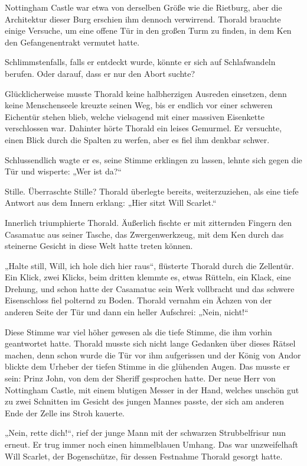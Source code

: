 Nottingham Castle war etwa von derselben Größe wie die Rietburg, aber die Architektur dieser Burg erschien ihm dennoch verwirrend. Thorald brauchte einige Versuche, um eine offene Tür in den großen Turm zu finden, in dem Ken den Gefangenentrakt vermutet hatte.

Schlimmstenfalls, falls er entdeckt wurde, könnte er sich auf Schlafwandeln berufen. Oder darauf, dass er nur den Abort suchte?

Glücklicherweise musste Thorald keine halbherzigen Ausreden einsetzen, denn keine Menschenseele kreuzte seinen Weg, bis er endlich vor einer schweren Eichentür stehen blieb, welche vielsagend mit einer massiven Eisenkette verschlossen war. Dahinter hörte Thorald ein leises Gemurmel. Er versuchte, einen Blick durch die Spalten zu werfen, aber es fiel ihm denkbar schwer.

Schlussendlich wagte er es, seine Stimme erklingen zu lassen, lehnte sich gegen die Tür und wisperte: „Wer ist da?“

Stille. Überraschte Stille? Thorald überlegte bereits, weiterzuziehen, als eine tiefe Antwort aus dem Innern erklang: „Hier sitzt Will Scarlet.“

Innerlich triumphierte Thorald. Äußerlich fischte er mit zitternden Fingern den Casamatuc aus seiner Tasche, das Zwergenwerkzeug, mit dem Ken durch das steinerne Gesicht in diese Welt hatte treten können.

„Halte still, Will, ich hole dich hier raus“, flüsterte Thorald durch die Zellentür. Ein Klick, zwei Klicks, beim dritten klemmte es, etwas Rütteln, ein Klack, eine Drehung, und schon hatte der Casamatuc sein Werk vollbracht und das schwere Eisenschloss fiel polternd zu Boden. Thorald vernahm ein Ächzen von der anderen Seite der Tür und dann ein heller Aufschrei: „Nein, nicht!“

Diese Stimme war viel höher gewesen als die tiefe Stimme, die ihm vorhin geantwortet hatte. Thorald musste sich nicht lange Gedanken über dieses Rätsel machen, denn schon wurde die Tür vor ihm aufgerissen und der König von Andor blickte dem Urheber der tiefen Stimme in die glühenden Augen. Das musste er sein: Prinz John, von dem der Sheriff gesprochen hatte. Der neue Herr von Nottingham Castle, mit einem blutigen Messer in der Hand, welches unschön gut zu zwei Schnitten im Gesicht des jungen Mannes passte, der sich am anderen Ende der Zelle ins Stroh kauerte.

„Nein, rette dich!“, rief der junge Mann mit der schwarzen Strubbelfrisur nun erneut. Er trug immer noch einen himmelblauen Umhang. Das war unzweifelhaft Will Scarlet, der Bogenschütze, für dessen Festnahme Thorald gesorgt hatte.

